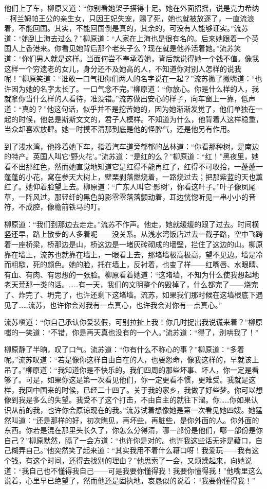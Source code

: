 \par 他们上了车，柳原又道：“你别看她架子搭得十足。她在外面招摇，说是克力希纳·柯兰姆帕王公的亲生女，只因王妃失宠，赐了死，她也就被放逐了，一直流浪着，不能回国。其实，不能回国倒是真的，其余的，可没有人能够证实。”流苏道：“她到上海去过么？”柳原道：“人家在上海也是很有名的。后来她跟着一个英国人上香港来。你看见她背后那个老头子么？现在就是他养活着她。”流苏笑道：“你们男人就是这样。当面何尝不奉承着她，背后就说得她一个钱不值。像我这样一个穷遗老的女儿，身分还不及她高的人，不知道你对别人怎样的说我呢！”柳原笑道：“谁敢一口气把你们两人的名字说在一起？”流苏撇了撇嘴道：“也许因为她的名字太长了。一口气念不完。”柳原道：“你放心。你是什么样的人，我就拿你当什么样的人看待，准没错。”流苏做出安心的样子，向车窗上一靠，低声道：“真的？”他这句话，似乎并不是挖苦她的，因为她渐渐发觉了，他们单独在一起的时候，他总是斯斯文文的，君子人模样。不知道为什么，他背着人这样稳重，当众却喜欢放肆。她一时摸不清那到底是他的怪脾气，还是他另有作用。
\par 到了浅水湾，他搀着她下车，指着汽车道旁郁郁的丛林道：“你看那种树，是南边的特产。英国人叫它‘野火花’。”流苏道：“是红的么？”柳原道：“红！”黑夜里，她看不出那红色，然而她直觉地知道它是红得不能再红了，红得不可收拾，一蓬蓬一蓬蓬的小花，窝在参天大树上，壁栗剥落燃烧着，一路烧过去；把那紫蓝的天也薰红了。她仰着脸望上去。柳原道：“广东人叫它‘影树’，你看这叶子。”叶子像凤尾草，一阵风过，那轻纤的黑色剪影零零落落颤动着，耳边恍惚听见一串小小的音符，不成腔，像檐前铁马的叮。
\par 柳原道：“我们到那边去走走。”流苏不作声。他走，她就缓缓的跟了过去。时间横竖还早，路上散步的人多着呢——没关系。从浅水湾饭店过去一截子路，空中飞跨着一座桥梁，桥那边是山，桥这边是一堵灰砖砌成的墙壁，拦住了这边的山。柳原靠在墙上，流苏也就靠在墙上，一眼看上去，那堵墙极高极高，望不见边。墙是冷而粗糙，死的颜色。她的脸，托在墙上，反衬着，也变了样——红嘴唇、水眼睛、有血、有肉、有思想的一张脸。柳原看着她道：“这堵墙，不知为什么使我想起地老天荒那一类的话。……有一天，我们的文明整个的毁掉了，什么都完了——烧完了、炸完了、坍完了，也许还剩下这堵墙。流苏，如果我们那时候在这墙根底下遇见了……流苏，也许你会对我有一点真心，也许我会对你有一点真心。”
\par 流苏嗔道：“你自己承认你爱装假，可别拉扯上我！你几时捉出我说谎来着？”柳原嗤的一笑道：“不错，你是再天真也没有的一个人。”流苏道：“得了，别哄我了！”
\par 柳原静了半晌，叹了口气。流苏道：“你有什么不称心的事？”柳原道：“多着呢。”流苏叹道：“若是像你这样自由自在的人，也要怨命，像我这样的，早就该上吊了。”柳原道：“我知道你是不快乐的。我们四周的那些坏事、坏人，你一定是看够了。可是，如果你这是第一次看见他们，你一定更看不惯，更难受。我就是这样，我回中国来的时候，已经二十四了。关于我的家乡，我做了好些梦。你可以想像到我是多么的失望。我受不了这个打击，不由自主的就往下溜。你……你如果认识从前的我，也许你会原谅现在的我。”流苏试着想像她是第一次看见她四嫂。她猛然叫道：“还是那样的好，初次瞧见，再坏些，再脏些，是你外面的人。你外面的东西。你若是混在那里头长久了，你怎么分得清，哪一部份是他们，哪一部份是你自己？”柳原默然，隔了一会方道：“也许你是对的。也许我这些话无非是藉口，自己糊弄自己。”他突然笑了起来道：“其实我用不着什么藉口呀！我爱玩——我有这个钱，有这个时间，还得去找别的理由？”他思索了一会，又烦躁起来，向她说道：“我自己也不懂得我自己——可是我要你懂得我！我要你懂得我！”他嘴里这么说着，心里早已绝望了，然而他还是固执地，哀恳似的说着：“我要你懂得我！”
